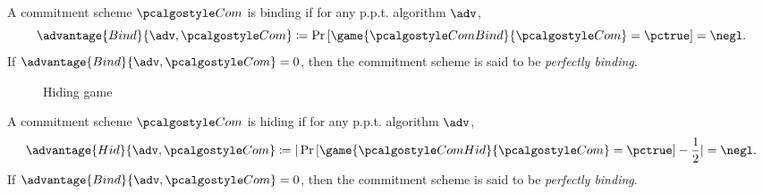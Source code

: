 \begin{definition}[Binding]
  A commitment scheme $\algo{Com}$ is binding if for any p.p.t. algorithm $\adv$,
 \[
  \advantage{Bind}{\adv, \algo{Com}} \defeq \pr{\game{\algo{ComBind}}{\algo{Com}} = \pctrue} = \negl.
 \]
 If $\advantage{Bind}{\adv, \algo{Com}} = 0$, then the commitment scheme is said to be \emph{perfectly binding}.
\end{definition}


\begin{figure}[tbhp]
  \begin{center}
    \begin{tcolorbox}[width=8cm]
      \begin{pchstack}[center]
      \end{pchstack}
    \end{tcolorbox}
  \end{center}
  \caption{Hiding game \label{fig:break-com-hid}}
\end{figure}

\begin{definition}[Hiding]
  A commitment scheme $\algo{Com}$ is hiding if for any p.p.t. algorithm $\adv$,
 \[
  \advantage{Hid}{\adv, \algo{Com}} \defeq |\pr{\game{\algo{ComHid}}{\algo{Com}} = \pctrue} - \frac{1}{2}| = \negl.
 \]
 If $\advantage{Bind}{\adv, \algo{Com}} = 0$, then the commitment scheme is said to be \emph{perfectly binding}.
\end{definition}

